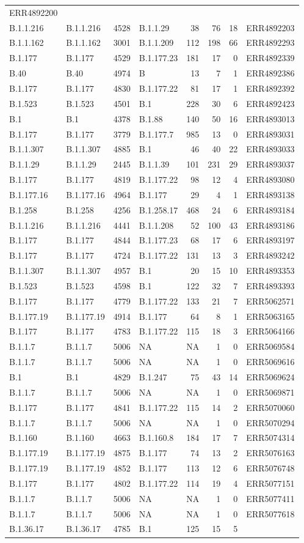 \documentclass[
]{article}
\begin{document}
\begin{longtable}[]{@{}llrlrrrl@{}}
ERR4892200\tabularnewline
B.1.1.216 & B.1.1.216 & 4528 & B.1.1.29 & 38 & 76 & 18 &
ERR4892203\tabularnewline
B.1.1.162 & B.1.1.162 & 3001 & B.1.1.209 & 112 & 198 & 66 &
ERR4892293\tabularnewline
B.1.177 & B.1.177 & 4529 & B.1.177.23 & 181 & 17 & 0 &
ERR4892339\tabularnewline
B.40 & B.40 & 4974 & B & 13 & 7 & 1 & ERR4892386\tabularnewline
B.1.177 & B.1.177 & 4830 & B.1.177.22 & 81 & 17 & 1 &
ERR4892392\tabularnewline
B.1.523 & B.1.523 & 4501 & B.1 & 228 & 30 & 6 &
ERR4892423\tabularnewline
B.1 & B.1 & 4378 & B.1.88 & 140 & 50 & 16 & ERR4893013\tabularnewline
B.1.177 & B.1.177 & 3779 & B.1.177.7 & 985 & 13 & 0 &
ERR4893031\tabularnewline
B.1.1.307 & B.1.1.307 & 4885 & B.1 & 46 & 40 & 22 &
ERR4893033\tabularnewline
B.1.1.29 & B.1.1.29 & 2445 & B.1.1.39 & 101 & 231 & 29 &
ERR4893037\tabularnewline
B.1.177 & B.1.177 & 4819 & B.1.177.22 & 98 & 12 & 4 &
ERR4893080\tabularnewline
B.1.177.16 & B.1.177.16 & 4964 & B.1.177 & 29 & 4 & 1 &
ERR4893138\tabularnewline
B.1.258 & B.1.258 & 4256 & B.1.258.17 & 468 & 24 & 6 &
ERR4893184\tabularnewline
B.1.1.216 & B.1.1.216 & 4441 & B.1.1.208 & 52 & 100 & 43 &
ERR4893186\tabularnewline
B.1.177 & B.1.177 & 4844 & B.1.177.23 & 68 & 17 & 6 &
ERR4893197\tabularnewline
B.1.177 & B.1.177 & 4724 & B.1.177.22 & 131 & 13 & 3 &
ERR4893242\tabularnewline
B.1.1.307 & B.1.1.307 & 4957 & B.1 & 20 & 15 & 10 &
ERR4893353\tabularnewline
B.1.523 & B.1.523 & 4598 & B.1 & 122 & 32 & 7 &
ERR4893393\tabularnewline
B.1.177 & B.1.177 & 4779 & B.1.177.22 & 133 & 21 & 7 &
ERR5062571\tabularnewline
B.1.177.19 & B.1.177.19 & 4914 & B.1.177 & 64 & 8 & 1 &
ERR5063165\tabularnewline
B.1.177 & B.1.177 & 4783 & B.1.177.22 & 115 & 18 & 3 &
ERR5064166\tabularnewline
B.1.1.7 & B.1.1.7 & 5006 & NA & NA & 1 & 0 & ERR5069584\tabularnewline
B.1.1.7 & B.1.1.7 & 5006 & NA & NA & 1 & 0 & ERR5069616\tabularnewline
B.1 & B.1 & 4829 & B.1.247 & 75 & 43 & 14 & ERR5069624\tabularnewline
B.1.1.7 & B.1.1.7 & 5006 & NA & NA & 1 & 0 & ERR5069871\tabularnewline
B.1.177 & B.1.177 & 4841 & B.1.177.22 & 115 & 14 & 2 &
ERR5070060\tabularnewline
B.1.1.7 & B.1.1.7 & 5006 & NA & NA & 1 & 0 & ERR5070294\tabularnewline
B.1.160 & B.1.160 & 4663 & B.1.160.8 & 184 & 17 & 7 &
ERR5074314\tabularnewline
B.1.177.19 & B.1.177.19 & 4875 & B.1.177 & 74 & 13 & 2 &
ERR5076163\tabularnewline
B.1.177.19 & B.1.177.19 & 4852 & B.1.177 & 113 & 12 & 6 &
ERR5076748\tabularnewline
B.1.177 & B.1.177 & 4802 & B.1.177.22 & 114 & 19 & 4 &
ERR5077151\tabularnewline
B.1.1.7 & B.1.1.7 & 5006 & NA & NA & 1 & 0 & ERR5077411\tabularnewline
B.1.1.7 & B.1.1.7 & 5006 & NA & NA & 1 & 0 & ERR5077618\tabularnewline
B.1.36.17 & B.1.36.17 & 4785 & B.1 & 125 & 15 & 5 &

\end{longtable}
\end{document}
